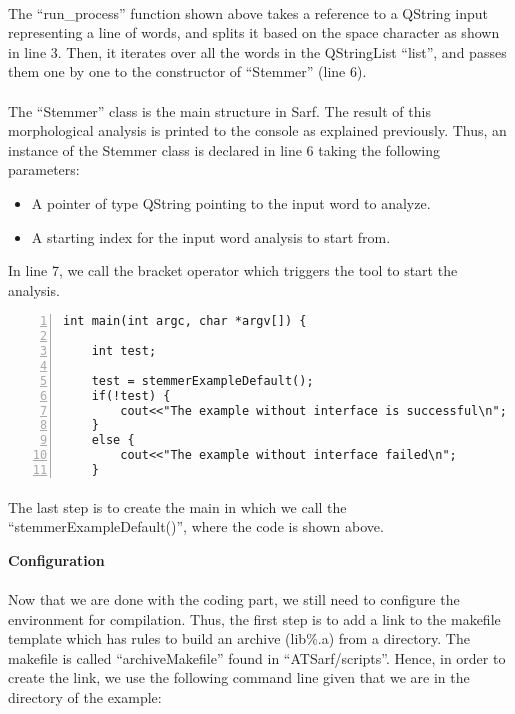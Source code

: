 \documentclass{article}
\begin{document}
\paragraph{}
The ``run\_process'' function shown above takes a reference to a QString input representing a line of words, and splits it based on the space character as shown in line 3. Then, it iterates over all the words in the QStringList ``list'', and passes them one by one to the constructor of ``Stemmer'' (line 6).

\paragraph{}
The ``Stemmer'' class is the main structure in Sarf. The result of this morphological analysis is printed to the console as explained previously. Thus, an instance of the Stemmer class is declared in line 6 taking the following parameters:
\begin{itemize}
\item A pointer of type QString pointing to the input word to analyze.
\item A starting index for the input word analysis to start from.
\end{itemize}
In line 7, we call the bracket operator which triggers the tool to start the analysis.

\begin{Verbatim}[numbers=left]
int main(int argc, char *argv[]) {

    int test;
    
    test = stemmerExampleDefault();
    if(!test) {
        cout<<"The example without interface is successful\n";
    }
    else {
        cout<<"The example without interface failed\n";
    }
\end{Verbatim}

\paragraph{}
The last step is to create the main in which we call the ``stemmerExampleDefault()'', where the code is shown above.

\begin{center}
\textbf{Configuration}
\end{center}

\paragraph{}
Now that we are done with the coding part, we still need to configure the environment for compilation. Thus, the first step is to add a link to the makefile template which has rules to build an archive (lib\%.a) from a directory. The makefile is called ``archiveMakefile'' found  in ``ATSarf/scripts''. Hence, in order to create the link, we use the following command line given that we are in the directory of the example:
\end{document}
